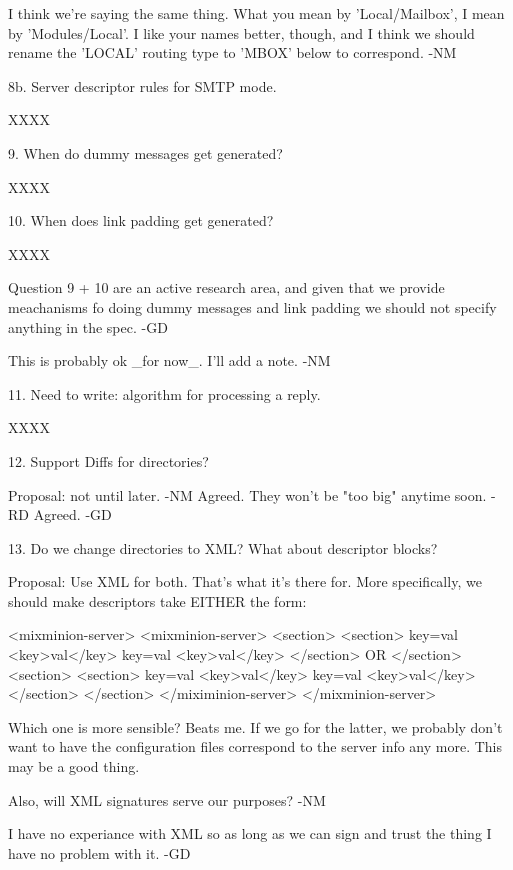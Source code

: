    I think we're saying the same thing.  What you mean by
   'Local/Mailbox', I mean by 'Modules/Local'.  I like your names
   better, though, and I think we should rename the 'LOCAL' routing
   type to 'MBOX' below to correspond. -NM
 
8b. Server descriptor rules for SMTP mode.

   XXXX

9. When do dummy messages get generated?

   XXXX

10. When does link padding get generated?

   XXXX

   Question 9 + 10 are an active research area, and given that we
   provide meachanisms fo doing dummy messages and link padding we
   should not specify anything in the spec. -GD

   This is probably ok _for now_.  I'll add a note. -NM

11. Need to write: algorithm for processing a reply.

   XXXX

12. Support Diffs for directories?

    Proposal: not until later. -NM
    Agreed. They won't be "too big" anytime soon. -RD
    Agreed. -GD

13. Do we change directories to XML?  What about descriptor blocks?

    Proposal: Use XML for both. That's what it's there for. More
    specifically, we should make descriptors take EITHER the form:

    <mixminion-server>            <mixminion-server>
      <section>                      <section>
      key=val                           <key>val</key>
      key=val                           <key>val</key>
      </section>         OR          </section>        
      <section>                      <section>
      key=val                           <key>val</key>
      key=val                           <key>val</key>
      </section>                     </section>        
    </miximinion-server>         </mixminion-server>

    Which one is more sensible?  Beats me.  If we go for the latter,
    we probably don't want to have the configuration files correspond
    to the server info any more.  This may be a good thing.

    Also, will XML signatures serve our purposes? -NM

    I have no experiance with XML so as long as we can sign and trust
    the thing I have no problem with it. -GD
  
